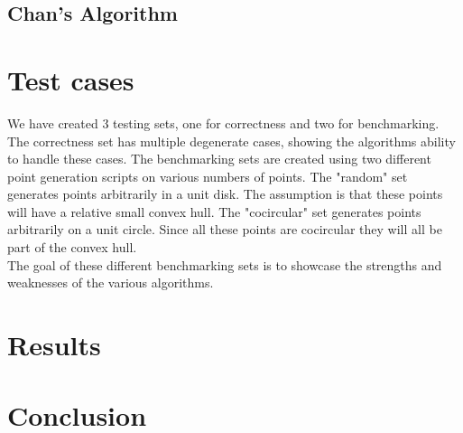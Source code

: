 \documentclass{article}
\begin{document}
\subsection*{Chan's Algorithm}

\section*{Test cases}
We have created 3 testing sets, one for correctness and two for benchmarking.
The correctness set has multiple degenerate cases, showing the algorithms ability to handle these cases.
The benchmarking sets are created using two different point generation scripts on various numbers of points.
The "random" set generates points arbitrarily in a unit disk. The assumption is that these points will have a relative small convex hull.
The "cocircular" set generates points arbitrarily on a unit circle. Since all these points are cocircular they will all be part of the convex hull.
\\
The goal of these different benchmarking sets is to showcase the strengths and weaknesses of the various algorithms.
\section*{Results}

\section*{Conclusion}
\end{document}
